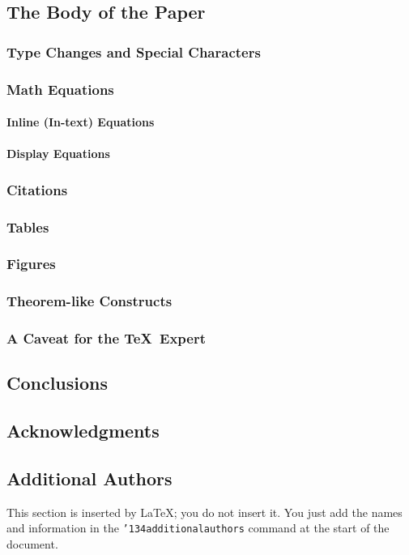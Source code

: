 \documentclass{edm_article}
\begin{document}
\subsection{The Body of the Paper}
\subsubsection{Type Changes and  Special Characters}
\subsubsection{Math Equations}
\paragraph{Inline (In-text) Equations}
\paragraph{Display Equations}
\subsubsection{Citations}
\subsubsection{Tables}
\subsubsection{Figures}
\subsubsection{Theorem-like Constructs}
\subsubsection*{A Caveat for the \TeX\ Expert}
\subsection{Conclusions}
\subsection{Acknowledgments}
\subsection{Additional Authors}
This section is inserted by \LaTeX; you do not insert it.
You just add the names and information in the
\texttt{{\char'134}additionalauthors} command at the start
of the document.
\end{document}

